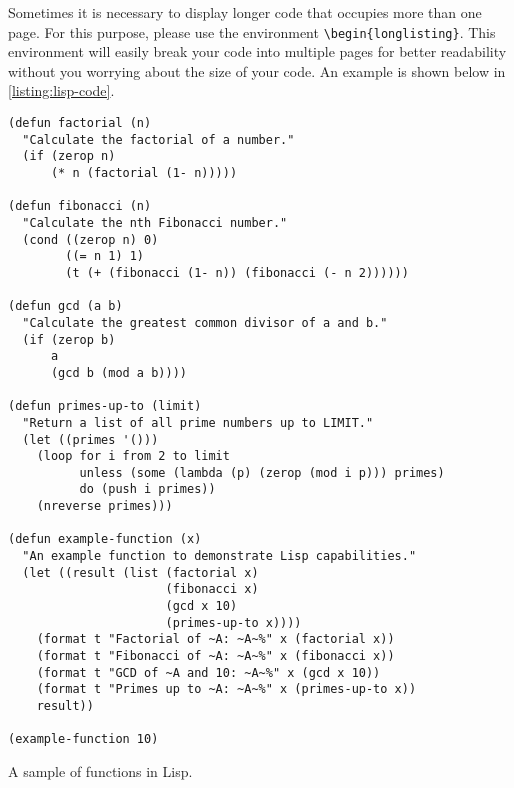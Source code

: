 Sometimes it is necessary to display longer code that occupies more than one page. For this purpose, please use the environment \verb|\begin{longlisting}|. This environment will easily break your code into multiple pages for better readability without you worrying about the size of your code. An example is shown below in \autoref{listing:lisp-code}.

\begin{longlisting}
\begin{verbatim}
(defun factorial (n)
  "Calculate the factorial of a number."
  (if (zerop n)
      (* n (factorial (1- n)))))

(defun fibonacci (n)
  "Calculate the nth Fibonacci number."
  (cond ((zerop n) 0)
        ((= n 1) 1)
        (t (+ (fibonacci (1- n)) (fibonacci (- n 2))))))

(defun gcd (a b)
  "Calculate the greatest common divisor of a and b."
  (if (zerop b)
      a
      (gcd b (mod a b))))

(defun primes-up-to (limit)
  "Return a list of all prime numbers up to LIMIT."
  (let ((primes '()))
    (loop for i from 2 to limit
          unless (some (lambda (p) (zerop (mod i p))) primes)
          do (push i primes))
    (nreverse primes)))

(defun example-function (x)
  "An example function to demonstrate Lisp capabilities."
  (let ((result (list (factorial x)
                      (fibonacci x)
                      (gcd x 10)
                      (primes-up-to x))))
    (format t "Factorial of ~A: ~A~%" x (factorial x))
    (format t "Fibonacci of ~A: ~A~%" x (fibonacci x))
    (format t "GCD of ~A and 10: ~A~%" x (gcd x 10))
    (format t "Primes up to ~A: ~A~%" x (primes-up-to x))
    result))

(example-function 10)
\end{verbatim}
\caption{A sample of functions in Lisp.}
\label{listing:lisp-code}
\end{longlisting}

